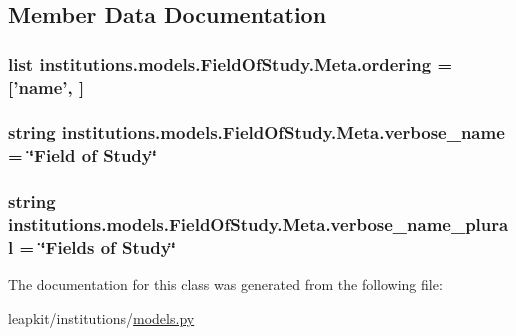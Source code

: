 \subsection{Member Data Documentation}
\hypertarget{classinstitutions_1_1models_1_1_field_of_study_1_1_meta_a82dfeecfc18d43b0964559fb88a7dfdf}{
\subsubsection[{ordering}]{\setlength{\rightskip}{0pt plus 5cm}list institutions.\-models.\-Field\-Of\-Study.\-Meta.\-ordering = \mbox{[}'{\bf name}', \mbox{]}\hspace{0.3cm}{\ttfamily [static]}}}\label{classinstitutions_1_1models_1_1_field_of_study_1_1_meta_a82dfeecfc18d43b0964559fb88a7dfdf}
\hypertarget{classinstitutions_1_1models_1_1_field_of_study_1_1_meta_ae9cdf056adc0c43a1ade826f5323a1df}{
\subsubsection[{verbose\-\_\-name}]{\setlength{\rightskip}{0pt plus 5cm}string institutions.\-models.\-Field\-Of\-Study.\-Meta.\-verbose\-\_\-name = \char`\"{}Field of Study\char`\"{}\hspace{0.3cm}{\ttfamily [static]}}}\label{classinstitutions_1_1models_1_1_field_of_study_1_1_meta_ae9cdf056adc0c43a1ade826f5323a1df}
\hypertarget{classinstitutions_1_1models_1_1_field_of_study_1_1_meta_a6ea5a77958c4fb17771e3d02e59de277}{
\subsubsection[{verbose\-\_\-name\-\_\-plural}]{\setlength{\rightskip}{0pt plus 5cm}string institutions.\-models.\-Field\-Of\-Study.\-Meta.\-verbose\-\_\-name\-\_\-plural = \char`\"{}Fields of Study\char`\"{}\hspace{0.3cm}{\ttfamily [static]}}}\label{classinstitutions_1_1models_1_1_field_of_study_1_1_meta_a6ea5a77958c4fb17771e3d02e59de277}


The documentation for this class was generated from the following file\-:\begin{DoxyCompactItemize}
\item 
leapkit/institutions/\hyperlink{institutions_2models_8py}{models.\-py}\end{DoxyCompactItemize}
